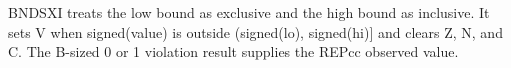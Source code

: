 BNDSXI treats the low bound as exclusive and the high bound as inclusive. It sets V when signed(value) is outside (signed(lo), signed(hi)] and clears Z, N, and C. The B-sized 0 or 1 violation result supplies the REPcc observed value.
